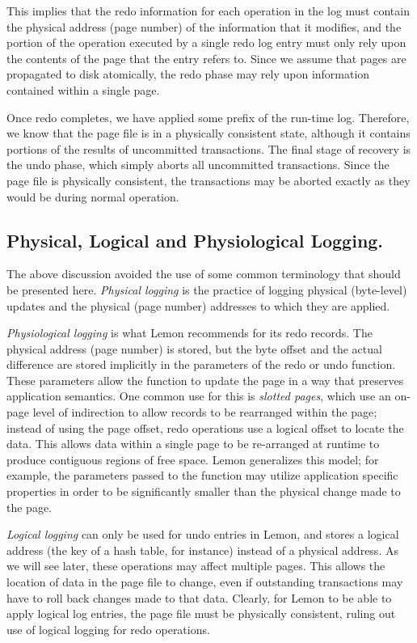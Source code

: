 \documentclass[letterpaper,twocolumn,english]{article}
\newcommand{\yad}{Lemon\xspace}
\begin{document}
This implies that the redo information for each operation in the log
must contain the physical address (page number) of the information
that it modifies, and the portion of the operation executed by a single
redo log entry must only rely upon the contents of the page that the 
entry refers to. Since we assume that pages are propagated to disk
atomically, the redo phase may rely upon information contained within
a single page.

Once redo completes, we have applied some prefix of the run-time log.
Therefore, we know that the page file is in
a physically consistent state, although it contains portions of the
results of uncommitted transactions. The final stage of recovery is
the undo phase, which simply aborts all uncommitted transactions. Since
the page file is physically consistent, the transactions may be aborted
exactly as they would be during normal operation. 


\subsection{Physical, Logical and Physiological Logging.}

The above discussion avoided the use of some common terminology 
that should be presented here. {\em Physical logging } 
is the practice of logging physical (byte-level) updates
and the physical (page number) addresses to which they are applied.

{\em Physiological logging } is what \yad recommends for its redo 
records. The physical address (page number) is stored, but the byte offset
and the actual difference are stored implicitly in the parameters
of the redo or undo function. These parameters allow the function to 
update the page in a way that preserves application semantics.
One common use for this is {\em slotted pages}, which use an on-page level of 
indirection to allow records to be rearranged within the page; instead of using the page offset, redo 
operations use a logical offset to locate the data. This allows data within
a single page to be re-arranged at runtime to produce contiguous
regions of free space. \yad generalizes this model; for example, the parameters passed to the function may utilize application specific properties in order to be significantly smaller than the physical change made to the page.~\cite{physiological}

{\em Logical logging } can only be used for undo entries in \yad, and
stores a logical address (the key of a hash table, for instance)
instead of a physical address. As we will see later, these operations
may affect multiple pages.  This allows the location of data in the
page file to change, even if outstanding transactions may have to roll
back changes made to that data. Clearly, for \yad to be able to apply
logical log entries, the page file must be physically consistent,
ruling out use of logical logging for redo operations.
\end{document}
